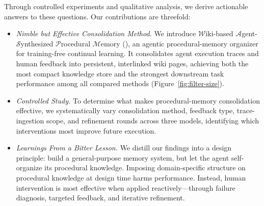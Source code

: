 Through controlled experiments and qualitative analysis, we derive actionable
answers to these questions. Our contributions are threefold:

\begin{itemize}[leftmargin=*,itemsep=2pt,topsep=3pt]
    \item \textit{Nimble but Effective Consolidation Method.} We introduce
    \(\mathcal{W}\)iki-based \(\mathcal{A}\)gent-\(\mathcal{S}\)ynthesized \(\mathcal{P}\)rocedural \(\mathcal{M}\)emory (\method), an agentic
    procedural-memory organizer for training-free continual learning. It
    consolidates agent execution traces and human feedback into persistent,
    interlinked wiki pages, achieving both the most compact knowledge store and
    the strongest downstream task performance among all compared methods
    (Figure~\ref{fig:filter-size}).
    \item \textit{Controlled Study.} To determine what makes procedural-memory
    consolidation effective, we systematically vary consolidation method,
    feedback type, trace-ingestion scope, and refinement rounds across three
    models, identifying which interventions most improve future execution.
    \item \textit{Learnings From a Bitter Lesson.} We distill our findings into
    a design principle: build a general-purpose memory
    system, but let the agent self-organize its procedural knowledge. Imposing
    domain-specific structure on procedural knowledge at design time harms
    performance. Instead, human intervention is most effective when applied
    reactively---through failure diagnosis, targeted feedback, and iterative
    refinement.
\end{itemize}
